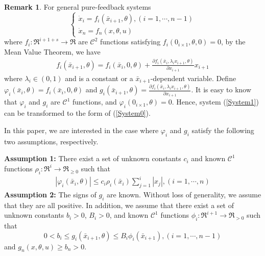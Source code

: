 \documentclass{tSYS2e}
\theoremstyle{plain}
\theoremstyle{definition}
\newtheorem{remark}{Remark}
\begin{document}
\begin{remark} { For general pure-feedback systems
\begin{equation}
\left\{
\begin{array}{l}
\dot{x}_{i}=f_{i}(\bar{x}_{i+1},\theta), (i=1,\cdots,n-1) \\
\dot{x}_{n}=f_{n}(x,\theta ,u)
\end{array}
\right.  \label{System1}
\end{equation}
where $f_{i}:\Re^{i+1+s}\rightarrow \Re $ are $\mathcal{C}^{2}$ functions satisfying $
f_{i}(0_{i\times 1},\theta,0)=0$, by the Mean Value Theorem, we
have
\begin{eqnarray}
f_{i}(\bar{x}_{i+1},\theta)=f_{i}(\bar{x}_{i},0,\theta)+\frac{
\partial f_{i}(\bar{x}_{i},\lambda _{i}x_{i+1},\theta)}{\partial x_{i+1}}
x_{i+1} \label{Dec1}
\end{eqnarray}
where $\lambda _{i}\in (0,1)$ and is a constant or a $\bar{x}_{i+1}$-dependent variable.
Define $\varphi _{i}(\bar{x}_{i},\theta)=f_{i}(\bar{x}_{i},0,\theta)$ and $
g_{i}(\bar{x}_{i+1},\theta)=\frac{\partial f_{i}(\bar{x}
_{i},\lambda _{i}x_{i+1},\theta)}{\partial x_{i+1}}$.
It is easy to know that $\varphi_{i}$ and $g_{i}$ are $\mathcal{C}^{1}$ functions, and $\varphi_{i}(0_{i\times 1},\theta)=0$.
Hence, system (\ref{System1}) can be transformed to the form of (\ref{System0}).}
\end{remark}

In this paper, we are interested in the case where $\varphi _{i}$ and $g_{i}$ satisfy the following two assumptions, respectively.

\textbf{Assumption 1:} There exist a set of unknown constants $
c_{i} $ and known $\mathcal{C}^{1}$ functions $\rho _{i}:\Re ^{i}\rightarrow \Re _{\geq
0}$ such that
\begin{eqnarray}
\left\vert\varphi _{i}(\bar{x}_{i},\theta )\right\vert\leq c_{i}\rho
_{i}(\bar{x}_{i})\sum_{j=1}^{i}\left\vert x_{j}\right\vert, (i=1,\cdots,n)  \label{Assumption1}
\end{eqnarray}
\textbf{Assumption 2:} The signs of $g_{i}$ are known.
Without loss of generality, we assume that they are all positive. In addition,
we assume that there exist a set of unknown constants $b_{i}>0$, $B_{i}>0$, and
known $\mathcal{C}^{1}$ functions $\phi _{i}:\Re ^{i+1}\rightarrow \Re _{> 0}$ such that
\begin{equation}
0<b_{i}\leq g_{i}(\bar{x}_{i+1},\theta)\leq B_{i}\phi _{i}(\bar{x}_{i+1}), (i=1,\cdots ,n-1)  \label{Assumption2}
\end{equation}
and $g_{n}(x,\theta,u)\geq b_{n}>0$.
\end{document}

